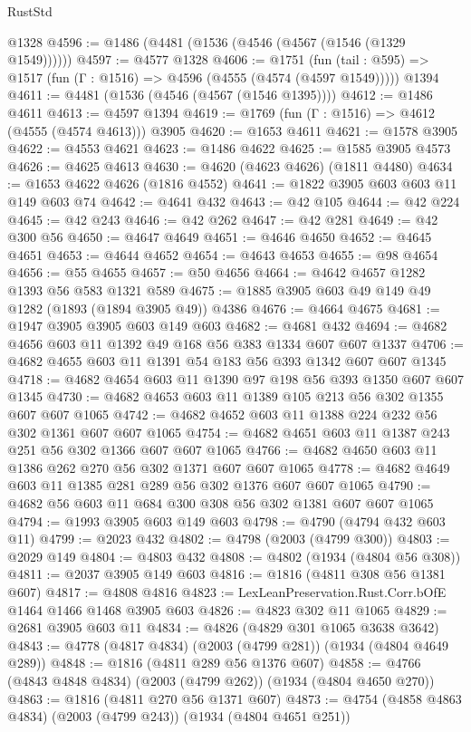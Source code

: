 \begin{lexlean}{RustStd}
\begin{coremodule}
    @1328
@4596 := @1486 (@4481 (@1536 (@4546 (@4567 (@1546 (@1329 @1549))))))
@4597 := @4577 @1328
@4606 := @1751
    (fun (tail : @595) => @1517 (fun (Γ : @1516) => @4596 (@4555 (@4574 (@4597 @1549)))))
    @1394
@4611 := @4481 (@1536 (@4546 (@4567 (@1546 @1395))))
@4612 := @1486 @4611
@4613 := @4597 @1394
@4619 := @1769 (fun (Γ : @1516) => @4612 (@4555 (@4574 @4613))) @3905
@4620 := @1653 @4611
@4621 := @1578 @3905
@4622 := @4553 @4621
@4623 := @1486 @4622
@4625 := @1585 @3905 @4573
@4626 := @4625 @4613
@4630 := @4620 (@4623 @4626) (@1811 @4480)
@4634 := @1653 @4622 @4626 (@1816 @4552)
@4641 := @1822 @3905 @603 @603 @11 @149 @603 @74
@4642 := @4641 @432
@4643 := @42 @105
@4644 := @42 @224
@4645 := @42 @243
@4646 := @42 @262
@4647 := @42 @281
@4649 := @42 @300 @56
@4650 := @4647 @4649
@4651 := @4646 @4650
@4652 := @4645 @4651
@4653 := @4644 @4652
@4654 := @4643 @4653
@4655 := @98 @4654
@4656 := @55 @4655
@4657 := @50 @4656
@4664 := @4642 @4657 @1282 @1393 @56 @583 @1321 @589
@4675 := @1885 @3905 @603 @49 @149 @49 @1282 (@1893 (@1894 @3905 @49)) @4386
@4676 := @4664 @4675
@4681 := @1947 @3905 @3905 @603 @149 @603
@4682 := @4681 @432
@4694 := @4682 @4656 @603 @11 @1392 @49 @168 @56 @383 @1334 @607 @607 @1337
@4706 := @4682 @4655 @603 @11 @1391 @54 @183 @56 @393 @1342 @607 @607 @1345
@4718 := @4682 @4654 @603 @11 @1390 @97 @198 @56 @393 @1350 @607 @607 @1345
@4730 := @4682 @4653 @603 @11 @1389 @105 @213 @56 @302 @1355 @607 @607 @1065
@4742 := @4682 @4652 @603 @11 @1388 @224 @232 @56 @302 @1361 @607 @607 @1065
@4754 := @4682 @4651 @603 @11 @1387 @243 @251 @56 @302 @1366 @607 @607 @1065
@4766 := @4682 @4650 @603 @11 @1386 @262 @270 @56 @302 @1371 @607 @607 @1065
@4778 := @4682 @4649 @603 @11 @1385 @281 @289 @56 @302 @1376 @607 @607 @1065
@4790 := @4682 @56 @603 @11 @684 @300 @308 @56 @302 @1381 @607 @607 @1065
@4794 := @1993 @3905 @603 @149 @603
@4798 := @4790 (@4794 @432 @603 @11)
@4799 := @2023 @432
@4802 := @4798 (@2003 (@4799 @300))
@4803 := @2029 @149
@4804 := @4803 @432
@4808 := @4802 (@1934 (@4804 @56 @308))
@4811 := @2037 @3905 @149 @603
@4816 := @1816 (@4811 @308 @56 @1381 @607)
@4817 := @4808 @4816
@4823 := LexLeanPreservation.Rust.Corr.bOfE @1464 @1466 @1468 @3905 @603
@4826 := @4823 @302 @11 @1065
@4829 := @2681 @3905 @603 @11
@4834 := @4826 (@4829 @301 @1065 @3638 @3642)
@4843 := @4778 (@4817 @4834) (@2003 (@4799 @281)) (@1934 (@4804 @4649 @289))
@4848 := @1816 (@4811 @289 @56 @1376 @607)
@4858 := @4766 (@4843 @4848 @4834) (@2003 (@4799 @262)) (@1934 (@4804 @4650 @270))
@4863 := @1816 (@4811 @270 @56 @1371 @607)
@4873 := @4754 (@4858 @4863 @4834) (@2003 (@4799 @243)) (@1934 (@4804 @4651 @251))

\end{coremodule}
\end{lexlean}
